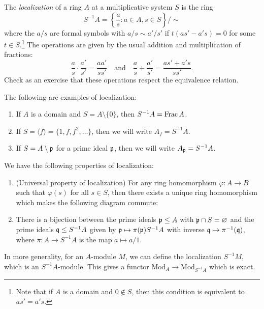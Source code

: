 \begin{definition}
  The \emph{localization} of a ring
  $A$ at a multiplicative system $S$ is
  the ring
  \[
    S^{-1} A
    = \left\{\frac{a}{s} : a \in A, s \in S\right\}/\sim
  \]
  where the $a / s$ are formal symbols
  with $a / s \sim a' / s'$ if
  $t(as' - a' s) = 0$ for some
  $t \in S$.\footnote{Note that if $A$ is a domain and $0 \notin S$, then this condition is equivalent to $as' = a's$.}
  The operations are given by
  the usual addition and multiplication
  of fractions:
  \[
    \frac{a}{s} \cdot \frac{a'}{s'}
    = \frac{a a'}{s s'} \quad \text{and} \quad
    \frac{a}{s} + \frac{a'}{s'}
    = \frac{a s' + a' s}{s s'}.
  \]
  Check as an exercise that these
  operations respect the equivalence
  relation.
\end{definition}

\begin{example}
  The following are examples of localization:
  \begin{enumerate}
    \item If $A$ is a domain and
      $S = A \setminus \{0\}$, then
      $S^{-1} A = \operatorname{Frac} A$.
    \item If $S = \langle f \rangle = \{1, f, f^2, \dots\}$, then
      we will write
      $A_f = S^{-1} A$.
    \item If $S = A \setminus \mathfrak{p}$ for
      a prime ideal $\mathfrak{p}$, then
      we will write $A_{\mathfrak{p}} = S^{-1} A$.
  \end{enumerate}
\end{example}

\begin{prop}
  We have the following properties
  of localization:
  \begin{enumerate}
    \item (Universal property of localization)
      For any ring homomorphism
      $\varphi : A \to B$ such that
      $\varphi(s)$ for all $s \in S$,
      then there exists a unique
      ring homomorphism which makes
      the following diagram commute:
      \begin{center}
      \end{center}
    \item There is a bijection
      between the prime ideals
      $\mathfrak{p} \le A$ with $\mathfrak{p} \cap S = \varnothing$
      and the prime ideals $\mathfrak{q} \le S^{-1} A$
      given by $\mathfrak{p} \mapsto \pi(\mathfrak{p}) S^{-1} A$
      with inverse $\mathfrak{q} \mapsto \pi^{-1}(\mathfrak{q})$,
      where $\pi : A \to S^{-1} A$ is
      the map $a \mapsto a / 1$.
  \end{enumerate}
\end{prop}

\begin{remark}
  In more generality, for an $A$-module $M$, we
  can define the localization $S^{-1} M$,
  which is an $S^{-1} A$-module. This gives
  a functor $\mathrm{Mod}_A \to \mathrm{Mod}_{S^{-1}A}$
  which is exact.
\end{remark}
